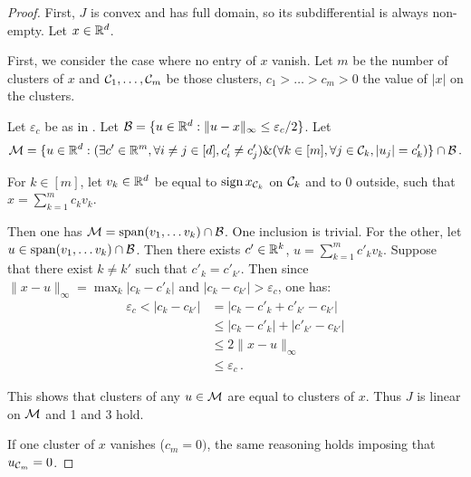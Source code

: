 \begin{proof}
  First, $J$ is convex and has full domain, so its subdifferential is always non-empty.
  Let $x \in \mathbb{R}^d$.

  First, we consider the case where no entry of $x$ vanish.
  Let $m$ be the number of clusters of $x$ and $\mathcal{C}_1, \ldots, \mathcal{C}_m$ be those clusters, $c_1 > \ldots > c_m > 0$ the value of $\lvert x \rvert$ on the clusters.

  Let $\varepsilon_c$ be as in .
  Let $\mathcal{B} = \{u \in \mathbb{R}^d: \lVert u - x \rVert_\infty \leq \varepsilon_c / 2\}$.
  Let
  \begin{equation}
    \mathcal{M} = \{ u \in \mathbb{R}^d : (\exists c' \in \mathbb{R}^m, \forall i \neq j \in [d], c'_i \neq c'_j) \& (\forall k \in [m], \forall j \in \mathcal{C}_k, |u_j| = c'_k) \} \cap \mathcal{B} \, .
  \end{equation}

  For $k \in [m]$, let $v_k \in \mathbb{R}^d$ be equal to $\operatorname{sign} x_{\mathcal{C}_k}$ on $\mathcal{C}_k$ and to 0 outside, such that $x = \sum_{k=1}^m c_k v_k$.

  Then one has $\mathcal{M} = \operatorname{span}(v_1, \ldots v_k) \cap \mathcal{B}$.
  One inclusion is trivial.
  For the other, let $u \in \operatorname{span}(v_1, \ldots v_k) \cap \mathcal{B}$.
  Then there exists $c' \in \mathbb{R}^k$, $u = \sum_{k=1}^m c'_k v_k$.
  Suppose that there exist $k \neq k'$ such that $c'_k = c'_{k'}$.
  Then since $\lVert x - u \rVert_\infty = \max_k |c_k - c'_k|$ and $|c_k - c_{k'}| > \varepsilon_c$, one has:
  \begin{align*}
     \varepsilon_c < |c_k - c_{k'}|
     &= |c_k - c'_k + c'_{k'} - c_{k'}| \\
     &\leq |c_k - c'_k| + |c'_{k'} - c_{k'}| \\
     &\leq 2 \lVert x - u \rVert_\infty \\
     &\leq  \varepsilon_c \, .
  \end{align*}

  This shows that clusters of any $u \in \mathcal{M}$ are equal to clusters of $x$.
  Thus $J$ is linear on $\mathcal{M}$ and 1 and 3 hold. 

  If one cluster of $x$ vanishes ($c_m = 0)$, the same reasoning holds imposing that $u_{\mathcal{C}_m} = 0$.

\end{proof}